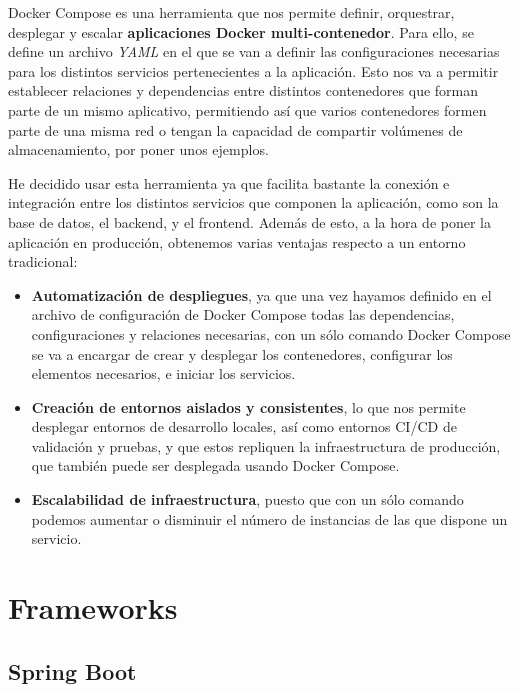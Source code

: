 Docker Compose es una herramienta que nos permite definir, orquestrar, desplegar y escalar \textbf{aplicaciones Docker multi-contenedor}. \cite{docker-compose:overview} Para ello, se define un archivo \textit{YAML} en el que se van a definir las  configuraciones necesarias para los distintos servicios pertenecientes a la aplicación. Esto nos va a permitir establecer relaciones y dependencias entre distintos contenedores que forman parte de un mismo aplicativo, permitiendo así que varios contenedores formen parte de una misma red o tengan la capacidad de compartir volúmenes de almacenamiento, por poner unos ejemplos.

He decidido usar esta herramienta ya que facilita bastante la conexión e integración entre los distintos servicios que componen la aplicación, como son la base de datos, el backend, y el frontend. Además de esto, a la hora de poner la aplicación en producción, obtenemos varias ventajas respecto a un entorno tradicional:

\begin{itemize}

\item \textbf{Automatización de despliegues}, ya que una vez hayamos definido en el archivo de configuración de Docker Compose todas las dependencias, configuraciones y relaciones necesarias, con un sólo comando Docker Compose se va a encargar de crear y desplegar los contenedores, configurar los elementos necesarios, e iniciar los servicios.
\item \textbf{Creación de entornos aislados y consistentes}, lo que nos permite desplegar entornos de desarrollo locales, así como entornos CI/CD de validación y pruebas, y que estos repliquen la infraestructura de producción, que también puede ser desplegada usando Docker Compose.
\item \textbf{Escalabilidad de infraestructura}, puesto que con un sólo comando podemos aumentar o disminuir el número de instancias de las que dispone un servicio.	
\end{itemize}

\section{Frameworks}


\subsection{Spring Boot}

